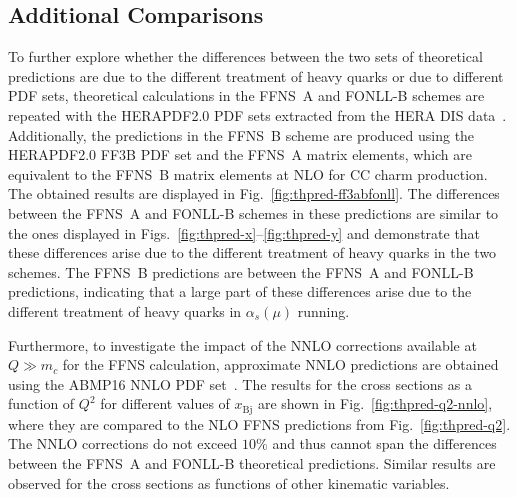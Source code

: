 \documentclass[pdftex,twocolumn,epjc3]{svjour3}          %
\newcommand{\abmp} {ABMP16\xspace}
\newcommand{\xbj}{\ensuremath{x_{\text{Bj}}}\xspace}
\newcommand{\fonll} {{FONLL-B}\xspace}
\newcommand{\ffns} {{FFNS~A}\xspace}
\newcommand{\ffnsb} {{FFNS~B}\xspace}
\newcommand{\ffthreeb} {{\hbox{HERAPDF2.0} FF3B}\xspace}
\begin{document}




\subsection{Additional Comparisons}
\label{sec:compareII}


To further explore whether the differences between the two sets of theoretical
predictions are due to the different treatment of heavy quarks or
due to different PDF sets, theoretical calculations in the \ffns and
\fonll schemes are repeated with the HERAPDF2.0 PDF sets extracted from
the  HERA DIS data~\cite{Abramowicz:2015mha}.
%
Additionally, the predictions in
the \ffnsb scheme are produced using the \ffthreeb PDF set and the
\ffns matrix elements, which are equivalent to the \ffnsb matrix
elements at NLO for CC charm production. The obtained results are
displayed in Fig.~\ref{fig:thpred-ff3abfonll}. The differences between
the \ffns and \fonll schemes in these predictions are similar to the
ones displayed in Figs.~\ref{fig:thpred-x}--\ref{fig:thpred-y} and
demonstrate that these differences arise due to the different treatment of
heavy quarks in the two schemes. The \ffnsb predictions are between
the \ffns and \fonll predictions, indicating that a large part of
these differences arise due to the different treatment of heavy quarks
in $\alpha_s(\mu)$ running.


Furthermore, to investigate the impact of the NNLO corrections
available at $Q \gg m_c$ for the FFNS calculation, approximate NNLO
predictions are obtained using the \abmp NNLO PDF
set~\cite{Alekhin:2017kpj}. The results for the cross sections as a
function of $Q^2$ for different values of \xbj are shown in
Fig.~\ref{fig:thpred-q2-nnlo}, where they are compared to the NLO FFNS
predictions from Fig.~\ref{fig:thpred-q2}. The NNLO corrections do not
exceed $10\%$ and thus cannot span the differences between the \ffns
and \fonll theoretical predictions. Similar results are observed for the
cross sections as functions of other kinematic variables.


\end{document}
